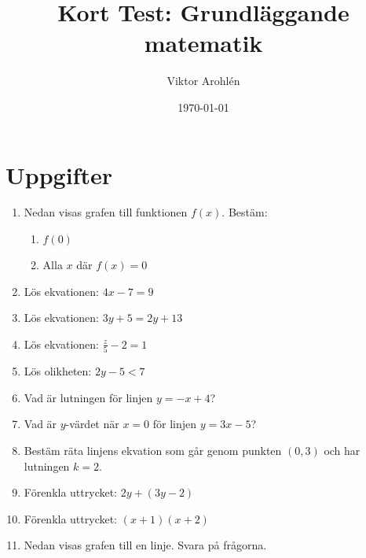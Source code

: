 \documentclass[a4paper,11pt]{article}
\title{Kort Test: Grundläggande matematik}
\author{Viktor Arohlén}
\date{\today}
\begin{document}
\maketitle

\section*{Uppgifter}
\begin{enumerate}[label=\textbf{\arabic*.}]
    \item Nedan visas grafen till funktionen $f(x)$. Bestäm:
    \begin{enumerate}[label=\alph*)]
        \item $f(0)$
        \item Alla $x$ där $f(x) = 0$
    \end{enumerate}
    \begin{center}
    \end{center}
    \item Lös ekvationen: $4x - 7 = 9$
    \item Lös ekvationen: $3y + 5 = 2y + 13$
    \item Lös ekvationen: $\frac{z}{5} - 2 = 1$
    \item Lös olikheten: $2y - 5 < 7$
    \item Vad är lutningen för linjen $y = -x + 4$?
    \item Vad är $y$-värdet när $x = 0$ för linjen $y = 3x - 5$?
    \item Bestäm räta linjens ekvation som går genom punkten $(0,3)$ och har lutningen $k=2$.
    \item Förenkla uttrycket: $2y + (3y - 2)$
    \item Förenkla uttrycket: $(x+1)(x+2)$   
    \newpage
    \item Nedan visas grafen till en linje. Svara på frågorna.
    \begin{center}
    \begin{tikzpicture}[scale=0.8]

\end{tikzpicture}
\end{center}
\end{enumerate}
\end{document}
